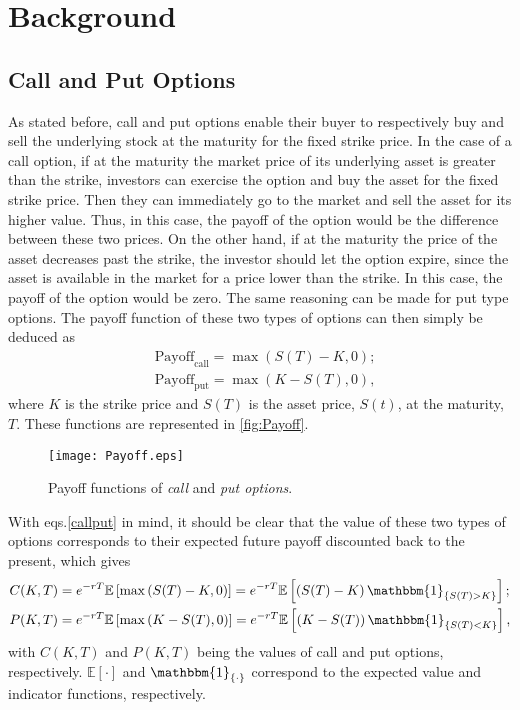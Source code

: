 \chapter{Background}
\label{chapter:background}
\section{Call and Put Options}
As stated before, call and put options enable their buyer to respectively buy and sell the underlying stock at the maturity for the fixed strike price.
In the case of a call option, if at the maturity the market price of its underlying asset is greater than the strike, investors can exercise the option and buy the asset for the fixed strike price. Then they can immediately go to the market and sell the asset for its higher value. Thus, in this case, the payoff of the option would be the difference between these two prices. On the other hand, if at the maturity the price of the asset decreases past the strike, the investor should let the option expire, since the asset is available in the market for a price lower than the strike. In this case, the payoff of the option would be zero.
The same reasoning can be made for put type options.
The payoff function of these two types of options can then simply be deduced as
\begin{equation}\label{callput}
\begin{split}
&\text{Payoff}_\text{call}=\max\left(S(T)-K,0\right);\\
&\text{Payoff}_\text{put}=\max\left(K-S(T),0\right),
\end{split}
\end{equation}
\noindent where $K$ is the strike price and $S(T)$ is the asset price, $S(t)$, at the maturity, $T$. These functions are represented in \autoref{fig:Payoff}.

\begin{figure}[!htb]
    \centering
      \texttt{[image: Payoff.eps]}
      \caption[Payoff functions of call and put options]{Payoff functions of \emph{call} and \emph{put options}.}\label{fig:Payoff}
    \end{figure}
    
With eqs.\eqref{callput} in mind, it should be clear that the value of these two types of options corresponds to their expected future payoff discounted back to the present, which gives
\begin{equation}
\begin{split}
&C(K,T)=e^{-rT}\mathbb{E}\left[\max\left(S(T)-K,0\right)\right]=e^{-rT}\mathbb{E}\left[\left(S(T)-K\right)\mathbbm{1}_{\left\{S(T)>K\right\}}\right];\\
&P(K,T)=e^{-rT}\mathbb{E}\left[\max\left(K-S(T),0\right)\right]=e^{-rT}\mathbb{E}\left[\left(K-S(T)\right)\mathbbm{1}_{\left\{S(T)<K\right\}}\right],
\end{split}
\end{equation}
\noindent with $C(K,T)$ and $P(K,T)$ being the values of call and put options, respectively. $\mathbb{E}[\cdot]$ and $\mathbbm{1}_{\{\cdot\}}$ correspond to the expected value and indicator functions, respectively.




